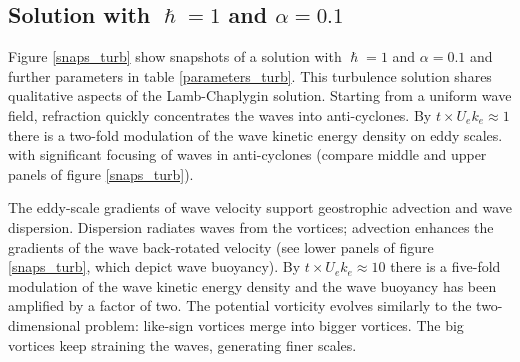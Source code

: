 \documentclass{jfm}
\begin{document}


%

\subsection{Solution with $\hslash = 1$ and $\alpha = 0.1$}

Figure \ref{snaps_turb} show snapshots of a solution with
$\hslash = 1$ and $\alpha = 0.1$ and further parameters in table \ref{parameters_turb}.
This turbulence solution shares qualitative aspects of the Lamb-Chaplygin solution.
Starting from a uniform wave field, refraction quickly concentrates the waves into
anti-cyclones. By
$t\times U_e k_e \approx 1$ there is a two-fold modulation of the wave kinetic
energy density on eddy scales. with significant focusing of waves in anti-cyclones
(compare middle and upper panels of figure \ref{snaps_turb}).

The eddy-scale gradients of wave velocity support geostrophic advection and
wave dispersion. Dispersion radiates waves from the vortices; advection enhances
the gradients of the wave back-rotated velocity (see lower panels of figure \ref{snaps_turb},
which depict wave buoyancy). By $t\times U_e k_e \approx 10$ there is a five-fold
modulation of the wave kinetic energy density and the wave buoyancy has been
amplified by a factor of two. The potential vorticity evolves similarly to the
two-dimensional problem: like-sign vortices merge into bigger vortices. The big
vortices keep straining the waves, generating finer scales.
\end{document}
